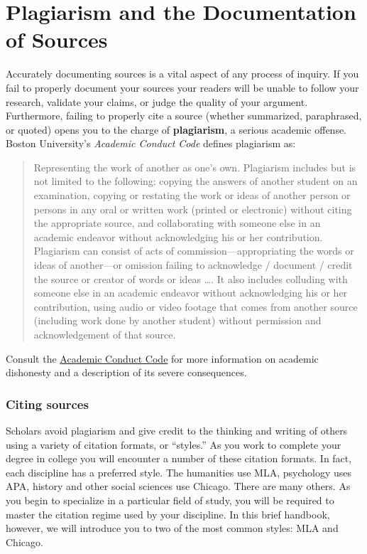 


\chapter{Plagiarism and the Documentation of Sources}

Accurately documenting sources is a vital aspect of any process of inquiry. If you fail to 
properly document your sources your readers will be unable to follow your research, 
validate your claims, or judge the quality of your argument. Furthermore, failing to 
properly cite a source (whether summarized, paraphrased, or quoted) opens you to the 
charge of \textbf{plagiarism}, a serious academic offense. 
Boston University's \emph{Academic Conduct Code} defines plagiarism as:

\begin{quote}Representing the work of another as one's own. Plagiarism includes but is 
not limited to the following: copying the answers of another student on an examination,
 copying or restating the work or ideas of another person or persons in any oral or 
written work (printed or electronic) without citing the appropriate source, and 
collaborating with someone else in an academic endeavor without acknowledging his or 
her contribution. Plagiarism can consist of acts of commission---appropriating the words 
or ideas of another---or omission failing to acknowledge / document / credit the source 
or creator of words or ideas \dots. It also includes colluding with someone else in an 
academic endeavor without acknowledging his or her contribution, using audio or video 
footage that comes from another source (including work done by another student) 
without permission and acknowledgement of that source.
\end{quote}
Consult the \href{http://www.bu.edu/academics/resources/academic-conduct-code}{Academic Conduct Code} 
for more information on academic dishonesty and a description of its severe consequences.


\subsection{Citing sources}

Scholars avoid plagiarism and give credit to the thinking and writing of others using a 
variety of citation formats, or ``styles.'' As you work to complete your degree in college 
you will encounter a number of these citation formats. In fact, each discipline has a 
preferred style. The humanities use MLA, psychology uses APA, history and other social 
sciences use Chicago. There are many others. As you begin to specialize in a particular 
field of study, you will be required to master the citation regime used by your discipline. 
In this brief handbook, however, we will introduce you to two of the most common 
styles: MLA and Chicago.

